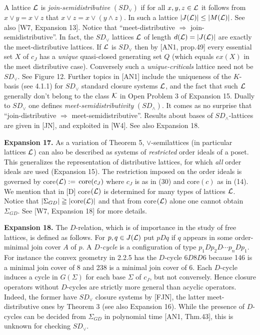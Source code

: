 \documentclass[11pt]{article}
\newcommand{\Ra}{\Rightarrow}
\begin{document}
 
A lattice ${\cal L}$ is {\it join-semidistributive} $(SD_\vee)$ if for all $x, y, z \in {\cal L}$ it follows from $x \vee y = x \vee z$ that $x \vee z = x \vee (y \wedge z)$. 
In such a lattice $|J({\cal L})| \leq |M({\cal L})|$. See also [W7, Expansion 13].  Notice that ``meet-distributive $\Ra$ join-semidistributive''. In fact, the $SD_\vee$ lattices ${\cal L}$ of length $d({\cal L}) = 
|J({\cal L})|$ are exactly the meet-distributive lattices. If ${\cal L}$ is $SD_\vee$ then by [AN1, prop.49] every essential set $X$ of $c_J$ has a {\it unique} quasi-closed generating set $Q$ (which equals $ex(X)$ in the meet distributive case). Conversely such a {\it unique-criticals} lattice need not be $SD_\vee$. See Figure 12.   Further topics in [AN1] include the uniqueness of the $K$-basis (see 4.1.1) for $SD_\vee$ standard closure systems ${\cal L}$, and the fact that such ${\cal L}$ generally don't belong to the class ${\cal K}$ in Open Problem 3 of Expansion 15. Dually to $SD_\vee$ one defines {\it meet-semidistributivity} $(SD_\wedge)$.  It comes as no surprise that ``join-distributive $\Ra$ 
meet-semidistributive''. Results about bases of $SD_\wedge$-lattices are given in [JN], and exploited in [W4].  See also Expansion 18.



{\bf Expansion 17.} As a variation of Theorem 5, $\vee$-semilattices (in particular lattices ${\cal L}$) can also be described as systems of {\it restricted} order ideals of a poset. This generalizes the representation of  distributive lattices, for which {\it all} order ideals are used (Expansion 15). The restriction imposed on the order ideals is governed by core$({\cal L}) : = \, \mbox{core}(c_J)$ where $c_J$ is as in (30) and core$(c)$ as in (14). We mention that in [D] core$({\cal L})$ is determined for many types of lattices ${\cal L}$. Notice that $|\Sigma_{GD}| \geqq |\mbox{core}({\cal L})|$ and that from core$({\cal L})$ alone one cannot obtain $\Sigma_{GD}$. See [W7, Expansion 18] for more details.

 
{\bf Expansion 18.} The $D$-relation, which is of importance in the study of free lattices, is defined as follows. For $p, q \in J({\cal L})$ put $pDq$ if $q$ appears in some order-minimal join cover $A$ of $p$. A {\it $D$-cycle} is a configuration of type $p_1Dp_2D \cdots p_n Dp_1$. For instance the convex geometry in 2.2.5 has the $D$-cycle $6D 8D6$ because 146 is a minimal join cover of 8 and 238 is a minimal join cover of 6.
Each $D$-cycle induces a cycle in $G(\Sigma)$ for each base $\Sigma$ of $c_J$, but not conversely. Hence closure operators without $D$-cycles are strictly more general than acyclic operators.
Indeed, the former have $SD_\vee$ closure systems by [FJN], the latter meet-distributive ones by Theorem 3 (see also Expansion 16). While the presence of $D$-cycles can be decided from $\Sigma_{GD}$ in polynomial time [AN1, Thm.43], this is unknown for checking $SD_\vee$.
\end{document}

